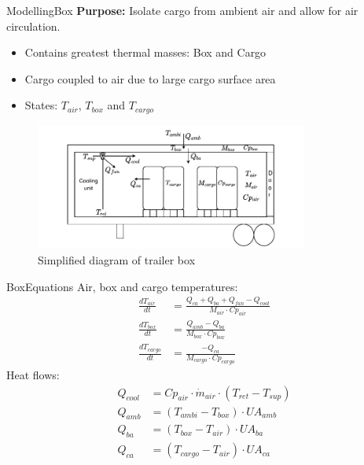 
\begin{frame}{Modelling}{Box}
	\textbf{Purpose:} Isolate cargo from ambient air and allow for air circulation.
	\begin{itemize}
		\item Contains greatest thermal masses: Box and Cargo
		\item Cargo coupled to air due to large cargo surface area
		\item States: $T_{air}$, $T_{box}$ and $T_{cargo}$
	\end{itemize}
	\begin{figure}[h!]
		\centering
		\includegraphics[width=0.8\textwidth]{../Graphics/Box.pdf}
		\caption{Simplified diagram of trailer box}
		\label{fig:box_diagram}
	\end{figure}


\end{frame}

\begin{frame}{Box}{Equations}
	Air, box and cargo temperatures:
	\begin{align}
		\frac{dT_{air}}{dt} &= \frac{Q_{ca} + Q_{ba} + Q_{fan} -Q_{cool}}{M_{air} \cdot Cp_{air}} \label{eq:box_dT_air} \\
		\frac{dT_{box}}{dt} &= \frac{Q_{amb} - Q_{ba}}{M_{box} \cdot Cp_{box}} \label{eq:box_dT_box} \\
		\frac{dT_{cargo}}{dt} &= \frac{-Q_{ca}}{M_{cargo} \cdot Cp_{cargo}} \label{eq:box_dT_cargo}
	\end{align}
	Heat flows:
	\begin{align}
		Q_{cool}   & = Cp_{air} \cdot \dot{m}_{air} \cdot (T_{ret} - T_{sup})	\label{eq:box_Qcool} \\
		Q_{amb}    & = (T_{ambi} - T_{box}) \cdot U A_{amb}						\label{eq:box_Qab}   \\
		Q_{ba}     & = (T_{box} - T_{air}) \cdot U A_{ba}						\label{eq:box_Qba}   \\
		Q_{ca}     & = (T_{cargo} - T_{air}) \cdot U A_{ca}                  	\label{eq:box_Qca}
	\end{align}
\end{frame}



